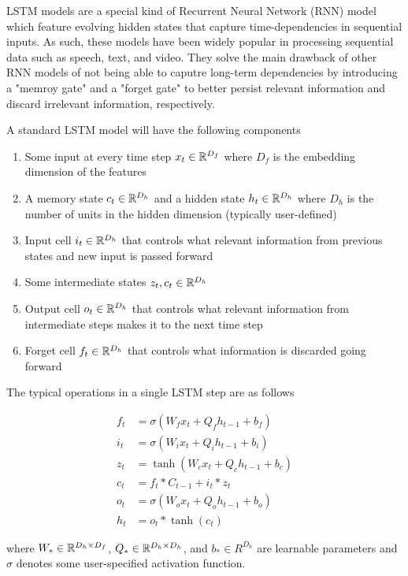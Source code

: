 
LSTM models are a special kind of Recurrent Neural Network (RNN) model which feature evolving hidden states that capture time-dependencies in sequential inputs. As such, these models have been widely popular in processing sequential data such as speech, text, and video. They solve the main drawback of other RNN models of not being able to caputre long-term dependencies by introducing a "memroy gate" and a "forget gate" to better persist relevant information and discard irrelevant information, respectively. 

A standard LSTM model will have the following components

\begin{enumerate}
	\item Some input at every time step $x_t \in \mathbb{R}^{D_f}$ where $D_f$ is the embedding dimension of the features
	\item A memory state $c_t \in \mathbb{R}^{D_h}$ and a hidden state $h_t \in \mathbb{R}^{D_h}$ where $D_h$ is the number of units in the hidden dimension (typically user-defined)
	\item Input cell $i_t \in \mathbb{R}^{D_h}$ that controls what relevant information from previous states and new input is passed forward
	\item Some intermediate states $z_t, c_t \in \mathbb{R}^{D_h}$
	\item Output cell $o_t \in \mathbb{R}^{D_h}$ that controls what relevant information from intermediate steps makes it to the next time step
	\item Forget cell $f_t \in \mathbb{R}^{D_h}$ that controls what information is discarded going forward
\end{enumerate}

The typical operations in a single LSTM step are as follows

\begin{align*}
f_t & = \sigma(W_fx_t + Q_fh_{t-1} + b_f) \\
i_t & = \sigma(W_ix_t + Q_ih_{t-1} + b_i) \\
z_t & = \tanh(W_cx_t + Q_ch_{t-1} + b_c) \\
c_t & = f_t * C_{t-1} + i_t * z_t \\
o_t & = \sigma(W_ox_t + Q_oh_{t-1} + b_o) \\
h_t & = o_t * \tanh(c_t)
\end{align*}

where $W_* \in \mathbb{R}^{D_h \times D_f}$, $Q_* \in \mathbb{R}^{D_h \times D_h}$, and $b_* \in R^{D_h}$ are learnable parameters and $\sigma$ denotes some user-specified activation function.

